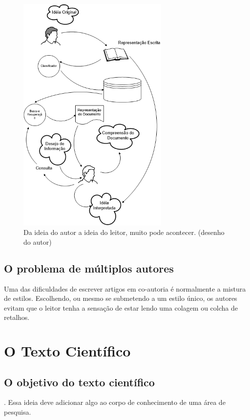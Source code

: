 \documentclass[openany]{book}
\begin{document}
\begin{figure}
    \centering
    \includegraphics[height=12cm]{imagens/textretrieval.png}
    \caption{Da ideia do autor a ideia do leitor, muito pode acontecer. (desenho do autor)}
    \label{fig:tr1}
\end{figure}

\section{O problema de múltiplos autores}

 Uma das dificuldades de escrever artigos em co-autoria é normalmente a mistura de estilos. Escolhendo, ou mesmo se submetendo a um estilo único, os autores evitam que o leitor tenha a sensação de estar lendo uma colagem ou colcha de retalhos.

\chapter{O Texto Científico}

\section{O objetivo do texto científico}

. Essa ideia deve adicionar algo ao corpo de conhecimento de uma área de pesquisa.
\end{document}
